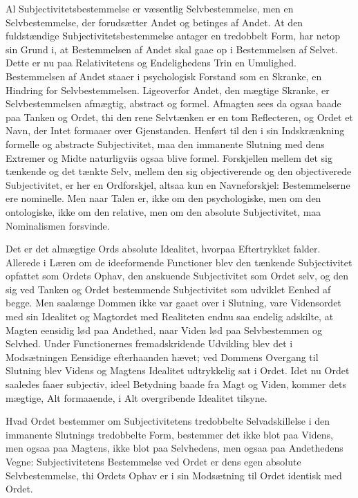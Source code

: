 \documentclass[12pt]{book}
\newcommand{\opage}[1]{\marginnote{\footnotesize\textit{[#1]}}}
\begin{document}
Al Subjectivitetsbestemmelse er væsentlig Selvbestemmelse, men en Selvbestemmelse, der forudsætter Andet og betinges af Andet. At den fuldstændige Subjectivitetsbestemmelse antager en tredobbelt Form, har netop sin Grund i, at Bestemmelsen af Andet skal gaae op i Bestemmelsen af Selvet. Dette er nu paa Relativitetens og Endelighedens Trin en Umulighed. Bestemmelsen af Andet staaer i psychologisk Forstand som en Skranke, en Hindring for Selvbestemmelsen. Ligeoverfor Andet, den mægtige Skranke, er Selvbestemmelsen afmægtig, abstract og formel. Afmagten sees da ogsaa baade paa Tanken og Ordet, thi den rene Selvtænken er en tom Reflecteren, og Ordet et Navn, der Intet formaaer over Gjenstanden. Henført til den i sin Indskrænkning formelle og abstracte Subjectivitet, maa den immanente Slutning med dens Extremer og Midte naturligviis ogsaa blive formel. Forskjellen mellem det sig tænkende og det tænkte Selv, mellem den sig objectiverende og den objectiverede Subjectivitet, er her en
\opage{337}Ordforskjel, altsaa kun en Navneforskjel: Bestemmelserne ere nominelle. Men naar Talen er, ikke om den psychologiske, men om den ontologiske, ikke om den relative, men om den absolute Subjectivitet, maa Nominalismen forsvinde.

Det er det almægtige Ords absolute Idealitet, hvorpaa Eftertrykket falder. Allerede i Læren om de ideeformende Functioner blev den tænkende Subjectivitet opfattet som Ordets Ophav, den anskuende Subjectivitet som Ordet selv, og den sig ved Tanken og Ordet bestemmende Subjectivitet som udviklet Eenhed af begge. Men saalænge Dommen ikke var gaaet over i Slutning, vare Vidensordet med sin Idealitet og Magtordet med Realiteten endnu saa endelig adskilte, at Magten eensidig lød paa Andethed, naar Viden lød paa Selvbestemmen og Selvhed. Under Functionernes fremadskridende Udvikling blev det i Modsætningen Eensidige efterhaanden hævet; ved Dommens Overgang til Slutning blev Videns og Magtens Idealitet udtrykkelig sat i Ordet. Idet nu Ordet saaledes faaer subjectiv, ideel Betydning baade fra Magt og Viden, kommer dets mægtige, Alt formaaende, i Alt overgribende Idealitet tilsyne.

Hvad Ordet bestemmer om Subjectivitetens tredobbelte Selvadskillelse i den immanente Slutnings tredobbelte Form, bestemmer det ikke blot paa Videns, men ogsaa paa Magtens, ikke blot paa Selvhedens, men ogsaa paa Andethedens Vegne: Subjectivitetens Bestemmelse ved Ordet er dens egen absolute Selvbestemmelse, thi Ordets Ophav er i sin Modsætning til Ordet identisk med Ordet.
\end{document}

